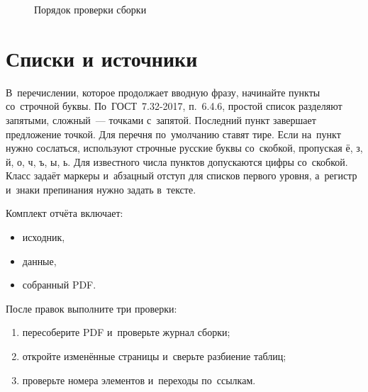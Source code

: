 \documentclass{bmstu}
\begin{document}
\begin{landscape}
\begin{figure}[H]
    \centering
    \caption{Порядок проверки сборки}
    \label{img:workflow}
\end{figure}
\end{landscape}

\section{Списки и источники}

В~перечислении, которое продолжает вводную фразу, начинайте пункты со~строчной буквы.
По~ГОСТ~7.32-2017, п.~6.4.6, простой список разделяют запятыми, сложный~--- точками с~запятой.
Последний пункт завершает предложение точкой.
Для перечня по~умолчанию ставят тире.
Если на~пункт нужно сослаться, используют строчные русские буквы со~скобкой, пропуская ё, з, й, о, ч, ъ, ы, ь.
Для известного числа пунктов допускаются цифры со~скобкой.
Класс задаёт маркеры и~абзацный отступ для списков первого уровня, а~регистр и~знаки препинания нужно задать в~тексте.

Комплект отчёта включает:
\begin{itemize}
    \item исходник,
    \item данные,
    \item собранный PDF.
\end{itemize}

После правок выполните три проверки:
\begin{enumerate}
    \item пересоберите PDF и~проверьте журнал сборки;
    \item откройте изменённые страницы и~сверьте разбиение таблиц;
    \item проверьте номера элементов и~переходы по~ссылкам.
\end{enumerate}
\end{document}
